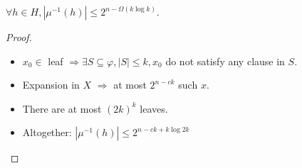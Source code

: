 \begin{frame}
    \begin{lemma}
        $\forall h \in H, |\mu^{-1}(h)| \le 2^{n - \Omega(k \log k)}$.
    \end{lemma}

    \pause

    \begin{proof}
        
        \begin{minipage}{0.38\linewidth}
            \centering
            
        \end{minipage}
        \begin{minipage}{0.58\linewidth}
            \centering
            
        \end{minipage}

        \pause
        \begin{itemize}
            \item $x_0 \in $ leaf $\Rightarrow \exists S \subseteq \varphi, |S| \le k, x_0$ do not
                satisfy \alert{any} clause in $S$.
            \item Expansion in $X$ $\Rightarrow$ at most $2^{n - ck}$ such $x$.
            \item There are at most $(2k)^k$ leaves.
            \item Altogether: $|\mu^{-1}(h)| \le 2^{n - ck + k \log 2k}$ 
        \end{itemize}
    \end{proof}
\end{frame}

